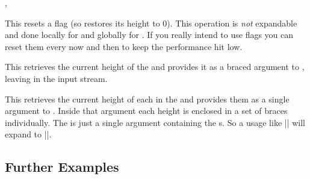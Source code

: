 \begin{function}{\ekvcFlagReset,\ekvcFlagResetGlobal}
  \begin{syntax}
  \end{syntax}
  This resets a flag (so restores its height to 0). This operation is \emph{not}
  expandable and done locally for  and globally for
  . If you really intend to use flags you can reset them
  every now and then to keep the performance hit low.
\end{function}

\begin{function}{\ekvcFlagGetHeight}
  \begin{syntax}
  \end{syntax}
  This retrieves the current height of the  and provides it as a
  braced argument to , leaving  in the input
  stream.
\end{function}

\begin{function}{\ekvcFlagGetHeights}
  \begin{syntax}
  \end{syntax}
  This retrieves the current height of each  in the 
  and provides them as a single argument to . Inside that argument
  each height is enclosed in a set of braces individually. The 
  is just a single argument containing the s. So a usage like
  |\ekvcFlagGetHeights{\myflagA\myflagB}{\stuff}| will expand to
  ||.
\end{function}


\subsection{Further Examples}

